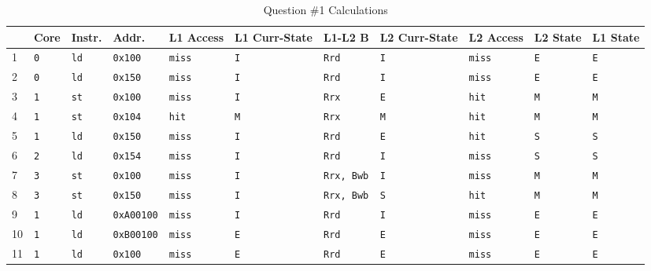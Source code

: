 \documentclass[a4paper,11pt]{article}
\newcommand{\T}{\texttt}
\begin{document}
\begin{sidewaystable}
\caption{Question \#1 Calculations} \label{tab:q1calc} 
\begin{center}
\begin{tabular}{| l | l | l | l | l | l | l | l | l | l | l |}
\hline
              &   Core     & Instr.        & Addr.         & L1 Access    & L1 Curr-State & L1-L2 B        &   L2 Curr-State & L2 Access  & L2 State & L1 State   \\ \hline
 1            &  \T{0}     & \T{ld}        & \T{0x100}     & \T{miss}     & \T{I}         & \T{Rrd}        &   \T{I}         & \T{miss}   &  \T{E}   &   \T{E}     \\ \hline
 2            &  \T{0}     & \T{ld}        & \T{0x150}     & \T{miss}     & \T{I}         & \T{Rrd}        &   \T{I}         & \T{miss}   &  \T{E}   &   \T{E}     \\ \hline
 3            &  \T{1}     & \T{st}        & \T{0x100}     & \T{miss}     & \T{I}         & \T{Rrx}        &   \T{E}         & \T{hit}    &  \T{M}   &   \T{M}     \\ \hline
 4            &  \T{1}     & \T{st}        & \T{0x104}     & \T{hit}      & \T{M}         & \T{Rrx}        &   \T{M}         & \T{hit}    &  \T{M}   &   \T{M}     \\ \hline
 5            &  \T{1}     & \T{ld}        & \T{0x150}     & \T{miss}     & \T{I}         & \T{Rrd}        &   \T{E}         & \T{hit}    &  \T{S}   &   \T{S}     \\ \hline
 6            &  \T{2}     & \T{ld}        & \T{0x154}     & \T{miss}     & \T{I}         & \T{Rrd}        &   \T{I}         & \T{miss}   &  \T{S}   &   \T{S}     \\ \hline
 7            &  \T{3}     & \T{st}        & \T{0x100}     & \T{miss}     & \T{I}         & \T{Rrx, Bwb}   &   \T{I}         & \T{miss}   &  \T{M}   &   \T{M}     \\ \hline
 8            &  \T{3}     & \T{st}        & \T{0x150}     & \T{miss}     & \T{I}         & \T{Rrx, Bwb}   &   \T{S}         & \T{hit}    &  \T{M}   &   \T{M}     \\ \hline
 9            &  \T{1}     & \T{ld}        & \T{0xA00100}  & \T{miss}     & \T{I}         & \T{Rrd}        &   \T{I}         & \T{miss}   &  \T{E}   &   \T{E}     \\ \hline
 10           &  \T{1}     & \T{ld}        & \T{0xB00100}  & \T{miss}     & \T{E}         & \T{Rrd}        &   \T{E}         & \T{miss}   &  \T{E}   &   \T{E}     \\ \hline
 11           &  \T{1}     & \T{ld}        & \T{0x100}     & \T{miss}     & \T{E}         & \T{Rrd}        &   \T{E}         & \T{miss}   &  \T{E}   &   \T{E}     \\ \hline
\end{tabular}
\end{center}
\end{sidewaystable}
\end{document}
